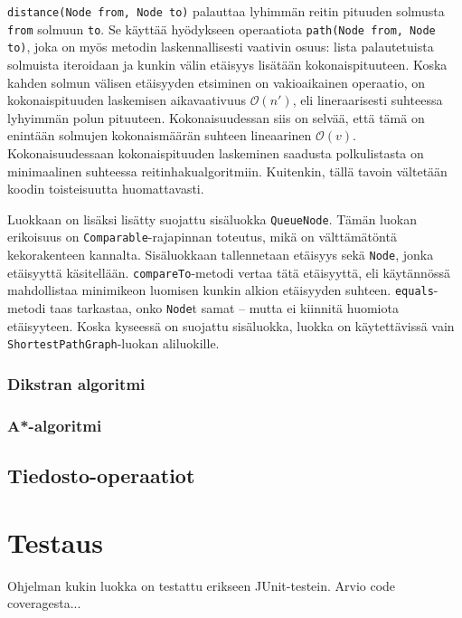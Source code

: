 \documentclass[10pt,a4paper]{article}
\begin{document}
\texttt{distance(Node from, Node to)} palauttaa lyhimmän reitin pituuden solmusta \texttt{from} solmuun \texttt{to}. Se käyttää hyödykseen operaatiota \texttt{path(Node from, Node to)}, joka on myös metodin laskennallisesti vaativin osuus: lista palautetuista solmuista iteroidaan ja kunkin välin etäisyys lisätään kokonaispituuteen. Koska kahden solmun välisen etäisyyden etsiminen on vakioaikainen operaatio, on kokonaispituuden laskemisen aikavaativuus $\mathcal{O}(n')$, eli lineraarisesti suhteessa lyhyimmän polun pituuteen. Kokonaisuudessan siis on selvää, että tämä on enintään solmujen kokonaismäärän suhteen lineaarinen $\mathcal{O}(v)$. Kokonaisuudessaan kokonaispituuden laskeminen saadusta polkulistasta on minimaalinen suhteessa reitinhakualgoritmiin. Kuitenkin, tällä tavoin vältetään koodin toisteisuutta huomattavasti.

Luokkaan on lisäksi lisätty suojattu sisäluokka \texttt{QueueNode}. Tämän luokan erikoisuus on \texttt{Comparable}-rajapinnan toteutus, mikä on välttämätöntä kekorakenteen kannalta. Sisäluokkaan tallennetaan etäisyys sekä \texttt{Node}, jonka etäisyyttä käsitellään. \texttt{compareTo}-metodi vertaa tätä etäisyyttä, eli käytännössä mahdollistaa minimikeon luomisen kunkin alkion etäisyyden suhteen. \texttt{equals}-metodi taas tarkastaa, onko \texttt{Node}t samat -- mutta ei kiinnitä huomiota etäisyyteen. Koska kyseessä on suojattu sisäluokka, luokka on käytettävissä vain \texttt{ShortestPathGraph}-luokan aliluokille.

\subsubsection{Dikstran algoritmi}

\subsubsection{A*-algoritmi}

\subsection{Tiedosto-operaatiot}
\label{io}

\section{Testaus}
\label{test}

Ohjelman kukin luokka on testattu erikseen JUnit-testein. Arvio code coveragesta...
\end{document}
